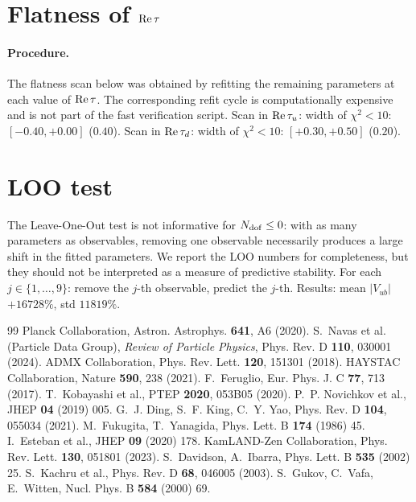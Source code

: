 \documentclass[12pt,a4paper]{article}
\numberwithin{equation}{section}
\begin{document}
\section{Flatness of \({\rm Re}\,\tau\)}
\paragraph{Procedure.}
The flatness scan below was obtained by refitting the remaining parameters at each value of \({\rm Re}\,\tau\). The corresponding refit cycle is computationally expensive and is not part of the fast verification script.
Scan in \({\rm Re}\,\tau_u\): width of \(\chi^2<10\): \([-0.40, +0.00]\) (\(0.40\)). Scan in \({\rm Re}\,\tau_d\): width of \(\chi^2<10\): \([+0.30, +0.50]\) (\(0.20\)).

\section{LOO test}
The Leave-One-Out test is not informative for \(N_{\rm dof} \le 0\): with as many parameters as observables, removing one observable necessarily produces a large shift in the fitted parameters. We report the LOO numbers for completeness, but they should not be interpreted as a measure of predictive stability. For each \(j\in\{1,\ldots,9\}\): remove the \(j\)-th observable, predict the \(j\)-th. Results: mean \(|V_{ub}|\) \(+16728\%\), std \(11819\%\).


\begin{thebibliography}{99}
 Planck Collaboration, Astron. Astrophys. \textbf{641}, A6 (2020).
 S.~Navas et al. (Particle Data Group), \emph{Review of Particle Physics}, Phys. Rev. D \textbf{110}, 030001 (2024).
 ADMX Collaboration, Phys. Rev. Lett. \textbf{120}, 151301 (2018).
 HAYSTAC Collaboration, Nature \textbf{590}, 238 (2021).
 F.~Feruglio, Eur. Phys. J. C \textbf{77}, 713 (2017).
 T.~Kobayashi et al., PTEP \textbf{2020}, 053B05 (2020).
 P.~P. Novichkov et al., JHEP \textbf{04} (2019) 005.
 G.~J. Ding, S.~F. King, C.~Y. Yao, Phys. Rev. D \textbf{104}, 055034 (2021).
 M.~Fukugita, T.~Yanagida, Phys. Lett. B \textbf{174} (1986) 45.
 I.~Esteban et al., JHEP \textbf{09} (2020) 178.
 KamLAND-Zen Collaboration, Phys. Rev. Lett. \textbf{130}, 051801 (2023).
 S.~Davidson, A.~Ibarra, Phys. Lett. B \textbf{535} (2002) 25.
 S.~Kachru et al., Phys. Rev. D \textbf{68}, 046005 (2003).
 S.~Gukov, C.~Vafa, E.~Witten, Nucl. Phys. B \textbf{584} (2000) 69.
\end{thebibliography}
\end{document}
